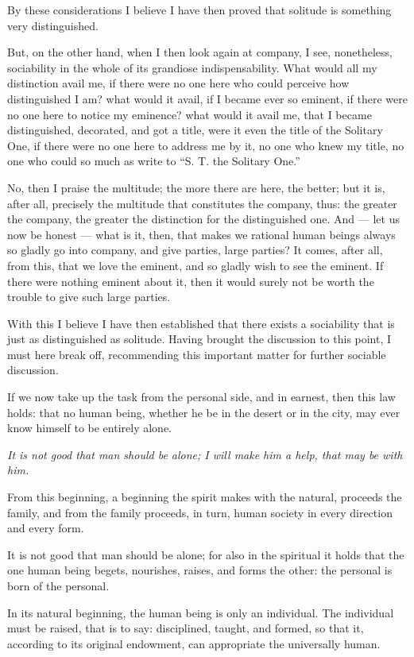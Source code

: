 \documentclass[12pt,a4paper]{book}
\begin{document}
By these considerations I believe I have then proved that solitude is something very distinguished.

But, on the other hand, when I then look again at company, I see, nonetheless, sociability in the whole of its grandiose indispensability. What would all my distinction avail me, if there were no one here who could perceive how distinguished I am? what would it avail, if I became ever so eminent, if there were no one here to notice my eminence? what would it avail me, that I became distinguished, decorated, and got a title, were it even the title of the Solitary One, if there were no one here to address me by it, no one who knew my title, no one who could so much as write to ``S. T. the Solitary One.''

No, then I praise the multitude; the more there are here, the better; but it is, after all, precisely the multitude that constitutes the company, thus: the greater the company, the greater the distinction for the distinguished one. And --- let us now be honest --- what is it, then, that makes we rational human beings always so gladly go into company, and give parties, large parties? It comes, after all, from this, that we love the eminent, and so gladly wish to see the eminent. If there were nothing eminent about it, then it would surely not be worth the trouble to give such large parties.

With this I believe I have then established that there exists a sociability that is just as distinguished as solitude. Having
brought the discussion to this point, I must here break off, recommending this important matter for further sociable discussion.

If we now take up the task from the personal side, and in earnest, then this law holds: that no human being, whether he be in the desert or in the city, may ever know himself to be entirely alone.

\emph{It is not good that man should be alone; I will make him a help, that may be with him.}

From this beginning, a beginning the spirit makes with the natural, proceeds the family, and from the family proceeds, in turn, human society in every direction and every form.

It is not good that man should be alone; for also in the spiritual it holds that the one human being begets, nourishes, raises, and forms the other: the personal is born of the personal.

In its natural beginning, the human being is only an individual. The individual must be raised, that is to say: disciplined, taught, and formed, so that it, according to its original endowment, can appropriate the universally human.
\end{document}
